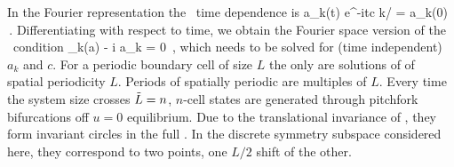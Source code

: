 
%

In the Fourier representation the \reqva\ time
dependence is
\beq
 a_k(t) e^{-itc k/\tildeL} = a_k(0)
\,.
Differentiating with respect to time, we obtain
the Fourier space version of the \reqv\ condition
\beq
 \pVeloc_k(a) - i  a_k = 0
\,,
which needs to be solved for (time independent) $a_k$ and $c$.
For a periodic boundary cell of size
$L$ the only {\eqva}  are
solutions of  of spatial periodicity $L$.
Periods of spatially periodic {\eqva} are multiples of $L$.
Every time the system size crosses  $\tilde{L}=n$,
$n$-cell states
are generated through pitchfork bifurcations off $u =0$
equilibrium.
Due to the translational invariance of {\KSe},
they form invariant circles
in the full \statesp.
In the discrete symmetry subspace considered here,
they correspond to two points, one $L/2$ shift of the other.

